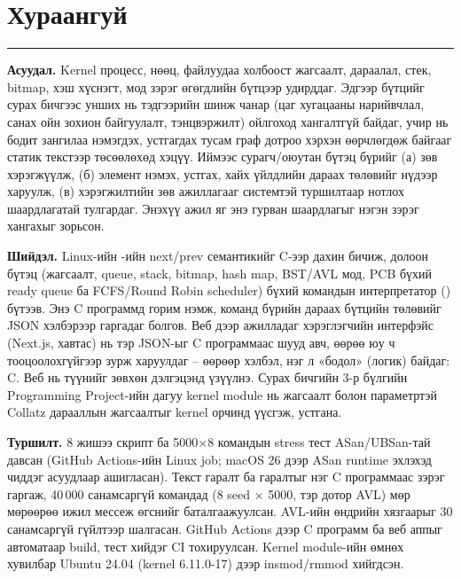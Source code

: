 \tableofcontents
\thispagestyle{fancy}
\clearpage

\section*{Хураангуй}
\noindent\rule{\textwidth}{1.2pt}\par\vspace{6pt}

\textbf{Асуудал.} Kernel процесс, нөөц, файлуудаа холбоост жагсаалт, дараалал, стек, bitmap, хэш хүснэгт, мод зэрэг өгөгдлийн бүтцээр удирддаг. Эдгээр бүтцийг сурах бичгээс унших нь тэдгээрийн шинж чанар (цаг хугацааны нарийвчлал, санах ойн зохион байгуулалт, тэнцвэржилт) ойлгоход хангалтгүй байдаг, учир нь бодит зангилаа нэмэгдэх, устгагдах тусам граф дотроо хэрхэн өөрчлөгдөж байгааг статик текстээр төсөөлөхөд хэцүү. Иймээс сурагч/оюутан бүтэц бүрийг (а) зөв хэрэгжүүлж, (б) элемент нэмэх, устгах, хайх үйлдлийн дараах төлөвийг нүдээр харуулж, (в) хэрэгжилтийн зөв ажиллагааг системтэй туршилтаар нотлох шаардлагатай тулгардаг. Энэхүү ажил яг энэ гурван шаардлагыг нэгэн зэрэг хангахыг зорьсон.

\textbf{Шийдэл.} Linux-ийн -ийн next/prev семантикийг C-ээр дахин бичиж, долоон бүтэц (жагсаалт, queue, stack, bitmap, hash map, BST/AVL мод, PCB бүхий ready queue ба FCFS/Round Robin scheduler) бүхий командын интерпретатор () бүтээв. Энэ C программд  горим нэмж, команд бүрийн дараах бүтцийн төлөвийг JSON хэлбэрээр гаргадаг болгов. Веб дээр ажилладаг хэрэглэгчийн интерфэйс (Next.js,  хавтас) нь тэр JSON-ыг C программаас шууд авч, өөрөө юу ч тооцоолохгүйгээр зурж харуулдаг -- өөрөөр хэлбэл, нэг л «бодол» (логик) байдаг: C. Веб нь түүнийг зөвхөн дэлгэцэнд үзүүлнэ. Сурах бичгийн 3-р бүлгийн Programming Project-ийн дагуу kernel module нь  жагсаалт болон  параметртэй Collatz дарааллын жагсаалтыг kernel орчинд үүсгэж, устгана.

\textbf{Туршилт.} 8 жишээ скрипт ба 5000×8 командын stress тест ASan/UBSan-тай давсан (GitHub Actions-ийн Linux job; macOS 26 дээр ASan runtime эхлэхэд чиддэг асуудлаар  ашигласан). Текст гаралт ба  гаралтыг нэг C программаас зэрэг гаргаж, 40\,000 санамсаргүй командад (8 seed × 5000, тэр дотор AVL) мөр мөрөөрөө ижил мессеж өгснийг баталгаажуулсан. AVL-ийн өндрийн хязгаарыг 30 санамсаргүй гүйлтээр шалгасан. GitHub Actions дээр C программ ба веб аппыг автоматаар build, тест хийдэг CI тохируулсан. Kernel module-ийн өмнөх хувилбар Ubuntu 24.04 (kernel 6.11.0-17) дээр insmod/rmmod хийгдсэн.

